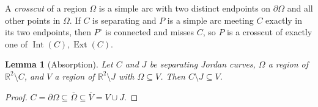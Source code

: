 \documentclass[11pt,a4paper]{article}
\theoremstyle{jsplain}
\newtheorem{lemma}[theorem]{Lemma}
\theoremstyle{jsdefn}
\newcommand{\Int}{\operatorname{Int}}
\newcommand{\Ext}{\operatorname{Ext}}
\begin{document}
A \emph{crosscut} of a region $\Omega$ is a simple arc with two
distinct endpoints on $\partial\Omega$ and all other points in
$\Omega$. If $C$ is separating and $P$ is a simple arc meeting $C$
exactly in its two endpoints, then $P^\circ$ is connected and misses
$C$, so $P$ is a crosscut of exactly one of $\Int(C),\Ext(C)$.

\begin{lemma}[Absorption]\label{lem:absorb}
Let $C$ and $J$ be separating Jordan curves, $\Omega$ a region of
$\mathbb R^2\setminus C$, and $V$ a region of $\mathbb R^2\setminus J$
with $\Omega\subseteq V$. Then $C\setminus J\subseteq V$.
\end{lemma}
\begin{proof}
$C=\partial\Omega\subseteq\overline\Omega\subseteq\overline V=V\cup J$.
\end{proof}
\end{document}
